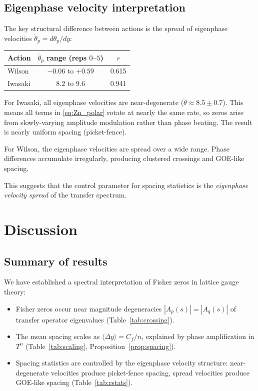 \documentclass[12pt]{article}
\theoremstyle{definition}
\theoremstyle{remark}
\newcommand{\avg}[1]{\langle #1 \rangle}
\begin{document}
\subsection{Eigenphase velocity interpretation}

The key structural difference between actions is the spread of
eigenphase velocities $\dot\theta_p = d\theta_p/dy$:

\begin{center}
\begin{tabular}{lcc}
\toprule
Action & $\dot\theta_p$ range (reps $0$--$5$) & $r$ \\
\midrule
Wilson & $-0.06$ to $+0.59$ & 0.615 \\
Iwasaki & $8.2$ to $9.6$ & 0.941 \\
\bottomrule
\end{tabular}
\end{center}

For Iwasaki, all eigenphase velocities are near-degenerate
($\dot\theta \approx 8.5 \pm 0.7$).  This means all terms in
\eqref{eq:Zn_polar} rotate at nearly the same rate, so zeros arise
from slowly-varying amplitude modulation rather than phase beating.
The result is nearly uniform spacing (picket-fence).

For Wilson, the eigenphase velocities are spread over a wide range.
Phase differences accumulate irregularly, producing clustered
crossings and GOE-like spacing.

This suggests that the control parameter for spacing statistics is
the \emph{eigenphase velocity spread} of the transfer spectrum.


\section{Discussion}
\label{sec:discussion}

\subsection{Summary of results}

We have established a spectral interpretation of Fisher zeros in
lattice gauge theory:

\begin{itemize}
\item Fisher zeros occur near magnitude degeneracies
  $|A_p(s)| = |A_q(s)|$ of transfer operator eigenvalues
  (Table~\ref{tab:crossing}).

\item The mean spacing scales as $\avg{\Delta y} = C_f/n$, explained
  by phase amplification in $T^n$ (Table~\ref{tab:scaling},
  Proposition~\ref{prop:spacing}).

\item Spacing statistics are controlled by the eigenphase velocity
  structure: near-degenerate velocities produce picket-fence spacing,
  spread velocities produce GOE-like spacing
  (Table~\ref{tab:rstats}).
\end{itemize}
\end{document}
